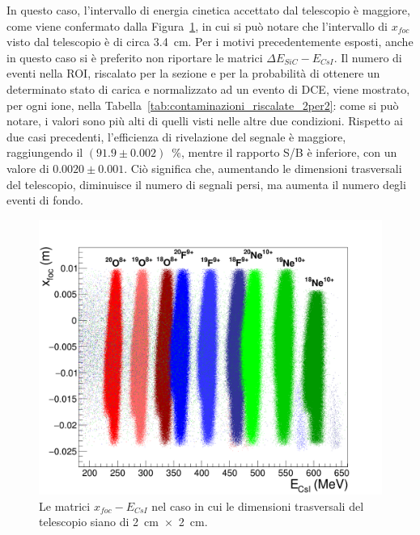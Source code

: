 In questo caso, l'intervallo di energia cinetica accettato dal telescopio è maggiore, come viene confermato dalla Figura~\ref{fig:xf_ecsi_2per2}, in cui si può notare che l'intervallo di $x_{foc}$ visto dal telescopio è di circa 3.4~cm.
Per i motivi precedentemente esposti, anche in questo caso si è preferito non riportare le matrici $\Delta E_{SiC} - E_{CsI}$.
Il numero di eventi nella ROI, riscalato per la sezione e per la probabilità di ottenere un determinato stato di carica e normalizzato ad un evento di DCE, viene mostrato, per ogni ione, nella Tabella~\ref{tab:contaminazioni_riscalate_2per2}: come si può notare, i valori sono più alti di quelli visti nelle altre due condizioni.
Rispetto ai due casi precedenti, l'efficienza di rivelazione del segnale è maggiore, raggiungendo il $(91.9 \pm 0.002)$~\%, mentre il rapporto S/B è inferiore, con un valore di $0.0020 \pm 0.001$.
Ciò significa che, aumentando le dimensioni trasversali del telescopio, diminuisce il numero di segnali persi, ma aumenta il numero degli eventi di fondo.




\begin{figure} [!p]
	\centering
	\includegraphics[width=\textwidth, keepaspectratio]{Grafici_Tesi2/2per2/xf_ecsi_quadrata.png}
	\caption{Le matrici $x_{foc} - E_{CsI}$ nel caso in cui le dimensioni trasversali del telescopio siano di 2~cm~$\times$~2~cm.} \label{fig:xf_ecsi_2per2}
\end{figure} 


